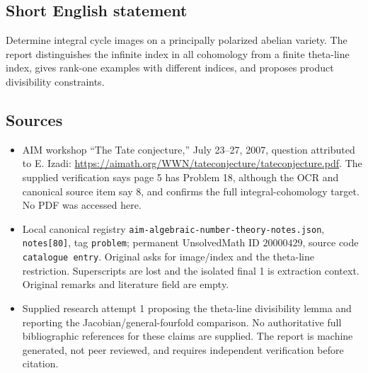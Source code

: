 \documentclass[11pt]{article}
\begin{document}
\subsection{Short English statement}
Determine integral cycle images on a principally polarized abelian variety. The report distinguishes the infinite index in all cohomology from a finite theta-line index, gives rank-one examples with different indices, and proposes product divisibility constraints.
\subsection{Sources}
\begin{itemize}
\item AIM workshop ``The Tate conjecture,'' July 23--27, 2007, question attributed to E. Izadi: \url{https://aimath.org/WWN/tateconjecture/tateconjecture.pdf}. The supplied verification says page 5 has Problem 18, although the OCR and canonical source item say 8, and confirms the full integral-cohomology target. No PDF was accessed here.
\item Local canonical registry \texttt{aim-algebraic-number-theory-notes.json}, \texttt{notes[80]}, tag \texttt{problem}; permanent UnsolvedMath ID \(20000429\), source code \texttt{catalogue entry}. Original asks for image/index and the theta-line restriction. Superscripts are lost and the isolated final 1 is extraction context. Original remarks and literature field are empty.
\item Supplied research attempt 1 proposing the theta-line divisibility lemma and reporting the Jacobian/general-fourfold comparison. No authoritative full bibliographic references for these claims are supplied. The report is machine generated, not peer reviewed, and requires independent verification before citation.
\end{itemize}
\end{document}
